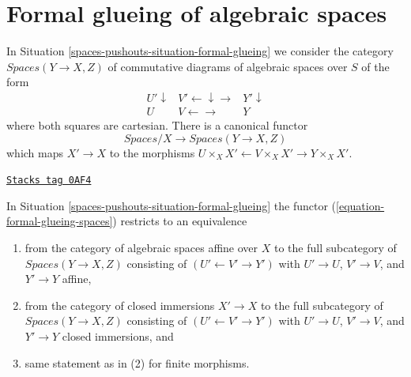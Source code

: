 \section{Formal glueing of algebraic spaces}
\label{spaces-pushouts-section-formal-glueing-spaces}
In Situation \ref{spaces-pushouts-situation-formal-glueing} we consider the category
$\textit{Spaces}(Y \to X, Z)$
of commutative diagrams of algebraic spaces over $S$ of the form
$$
\begin{array}{ccc}U' \downarrow & V' \longleftarrow\downarrow\longrightarrow & Y' \downarrow \\ U & V \longleftarrow\longrightarrow & Y\end{array}
$$
where both squares are cartesian. There is a canonical functor
\begin{equation}
\label{equation-formal-glueing-spaces}
\textit{Spaces}/X \longrightarrow \textit{Spaces}(Y \to X, Z)
\end{equation}
which maps $X' \to X$ to the morphisms
$U \times_X X' \leftarrow V \times_X X' \rightarrow Y \times_X X'$.

\begin{lemma}
\label{spaces-pushouts-lemma-equivalence-on-affine}
\href{https://stacks.math.columbia.edu/tag/0AF4}{\texttt{Stacks tag 0AF4}}

In Situation \ref{spaces-pushouts-situation-formal-glueing} the functor
(\ref{equation-formal-glueing-spaces}) restricts to an
equivalence
\begin{enumerate}
\item from the category of algebraic spaces affine over $X$
to the full subcategory of $\textit{Spaces}(Y \to X, Z)$ consisting
of $(U' \leftarrow V' \rightarrow Y')$ with $U' \to U$, $V' \to V$,
and $Y' \to Y$ affine,
\item from the category of closed immersions $X' \to X$
to the full subcategory of $\textit{Spaces}(Y \to X, Z)$ consisting
of $(U' \leftarrow V' \rightarrow Y')$ with $U' \to U$, $V' \to V$,
and $Y' \to Y$ closed immersions, and
\item same statement as in (2) for finite morphisms.
\end{enumerate}
\end{lemma}

